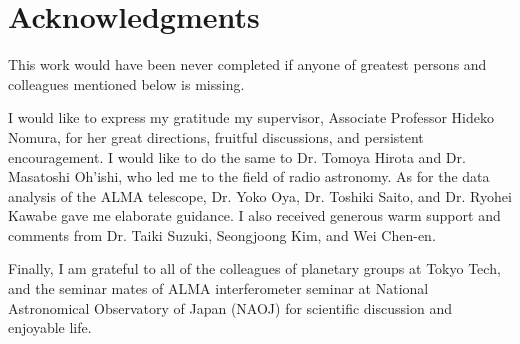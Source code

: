 \chapter*{Acknowledgments}

This work would have been never completed if anyone of greatest persons and colleagues mentioned below is missing.

I would like to express my gratitude my supervisor, Associate Professor Hideko Nomura, for her great
directions, fruitful discussions, and persistent encouragement.
I would like to do the same to Dr. Tomoya Hirota and Dr. Masatoshi Oh'ishi, who led me to the field of radio astronomy.
As for the data analysis of the ALMA telescope, Dr. Yoko Oya, Dr. Toshiki Saito, and Dr. Ryohei Kawabe gave me elaborate guidance.
I also received generous warm support and comments from Dr. Taiki Suzuki, Seongjoong Kim, and Wei Chen-en.

Finally, I am grateful to all of the colleagues of planetary groups at Tokyo Tech, and the seminar mates of ALMA interferometer seminar at National Astronomical Observatory of Japan (NAOJ) for scientific discussion and enjoyable life.

